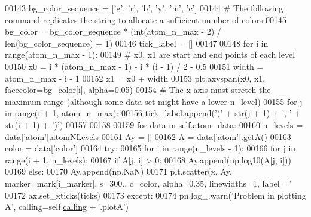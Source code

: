 \begin{DoxyCode}
00143         bg\_color\_sequence = [\textcolor{stringliteral}{'g'}, \textcolor{stringliteral}{'}\textcolor{stringliteral}{r', '}b', 'y', 'm', 'c']
00144         \textcolor{comment}{# The following command replicates the string to allocate a sufficient number of colors}
00145         bg\_color = bg\_color\_sequence * (int(atom\_n\_max - 2) / len(bg\_color\_sequence) + 1)
00146         tick\_label = []
00147         
00148         \textcolor{keywordflow}{for} i \textcolor{keywordflow}{in} range(atom\_n\_max - 1):
00149             \textcolor{comment}{# x0, x1 are start and end points of each level}
00150             x0 = i * (atom\_n\_max - 1) - i * (i - 1) / 2 - 0.5
00151             width = atom\_n\_max - i - 1
00152             x1 = x0 + width
00153             plt.axvspan(x0, x1, facecolor=bg\_color[i], alpha=0.05)
00154             \textcolor{comment}{# The x axis must stretch the maximum range (although some data set might have a lower n\_level)}
00155             \textcolor{keywordflow}{for} j \textcolor{keywordflow}{in} range(i + 1, atom\_n\_max):
00156                 tick\_label.append(\textcolor{stringliteral}{'('} + str(j + 1) + \textcolor{stringliteral}{', '} + str(i + 1) + \textcolor{stringliteral}{')'})
00157 
00158 
00159         \textcolor{keywordflow}{for} data \textcolor{keywordflow}{in} self.\hyperlink{classpyneb_1_1plot_1_1plot_atomic_data_1_1_data_plot_aee33ad460a38cb4293a5bd89cec12294}{atom\_data}:
00160             n\_levels = data[\textcolor{stringliteral}{'atom'}].atomNLevels
00161             Ay = []
00162             A = data[\textcolor{stringliteral}{'atom'}].getA()
00163             color = data[\textcolor{stringliteral}{'color'}]
00164             \textcolor{keywordflow}{try}:
00165                 \textcolor{keywordflow}{for} i \textcolor{keywordflow}{in} range(n\_levels - 1):
00166                     \textcolor{keywordflow}{for} j \textcolor{keywordflow}{in} range(i + 1, n\_levels):
00167                         \textcolor{keywordflow}{if} A[j, i] > 0:
00168                             Ay.append(np.log10(A[j, i]))
00169                         \textcolor{keywordflow}{else}:
00170                             Ay.append(np.NaN)
00171                 plt.scatter(x, Ay, marker=mark[i\_marker], s=300., c=color, alpha=0.35, linewidths=1, label=\textcolor{stringliteral}{
      '%
00172                 ax.set\_xticks(ticks)
00173             \textcolor{keywordflow}{except}:
00174                 pn.log\_.warn(\textcolor{stringliteral}{'Problem in plotting A'}, calling=self.\hyperlink{classpyneb_1_1plot_1_1plot_atomic_data_1_1_data_plot_a393a133b607541c57d5ebc5a34687e3f}{calling} + \textcolor{stringliteral}{'.plotA'})
}
\end{DoxyCode}
